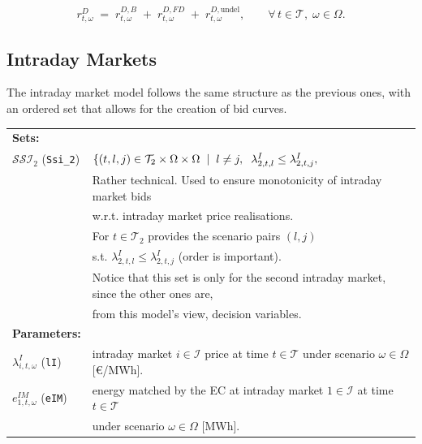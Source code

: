\documentclass{article}
\begin{document}
\begin{equation} \label{EQ:RDcomp}
    r^{D}_{t,\omega} \;=\;
        r^{D,B}_{t,\omega}
      \;+\; r^{D,FD}_{t,\omega}
      \;+\; r^{D,\text{undel}}_{t,\omega},
    \qquad \forall\, t\in\mathcal T,\;\omega\in\Omega .
\end{equation}

\subsection{Intraday Markets}

The intraday market model follows the same structure as the previous ones, with an ordered set that allows for the creation of bid curves.

\begin{tabularx}{\textwidth}{l l}
    \textbf{Sets:} \\
    	$\mathcal{SSI}_2$ (\verb|Ssi_2|) & $\{(t, l, j) \in \mathcal{T}_2 \times \Omega \times \Omega \hspace{2mm} | \hspace{2mm} l \neq j, \hspace{2mm} \lambda^I_{2, t, l} \leq \lambda^I_{2, t, j}, \hspace{2mm}$ \\ 
	& Rather technical. Used to ensure monotonicity of intraday market bids \\
	& w.r.t. intraday market price realisations. \\
	& For $t \in \mathcal{T}_2$ provides the scenario pairs $(l, j)$ \\
	& s.t. $\lambda^I_{2, t, l} \leq \lambda^I_{2, t, j}$ (order is important).\\
    & Notice that this set is only for the second intraday market, since the other ones are,\\
    & from this model's view, decision variables.
    \\
    
    \textbf{Parameters:} \\
    	$\lambda^I_{i, t, \omega}$ (\verb|lI|) & intraday market $i \in \mathcal{I}$ price at time $t \in \mathcal{T}$ under scenario $\omega \in \Omega$ [\euro/MWh]. \\
            $e^{IM}_{1, t, \omega}$ (\verb|eIM|) & energy matched by the EC at intraday market $1 \in \mathcal{I}$ at time $t \in \mathcal{T}$ \\
    & under scenario $\omega \in \Omega$ [MWh]. \\


\end{tabularx}
\end{document}
